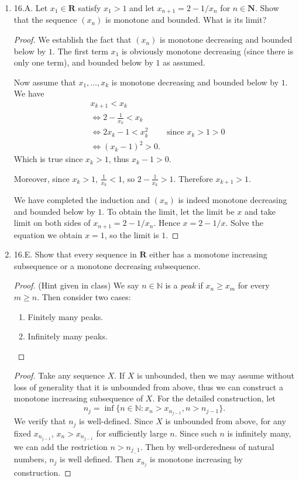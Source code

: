 
\begin{enumerate}
	\item 16.A. Let $x_1 \in \boldsymbol{R}$ satisfy $x_1>1$ and let $x_{n+1}=2-1 / x_n$ for $n \in \boldsymbol{N}$. Show that the sequence $\left(x_n\right)$ is monotone and bounded. What is its limit?
\begin{proof}
	We establish the fact that $(x_n)$ is monotone decreasing and bounded below by $1$. The first term $x_1$ is obviously monotone decreasing (since there is only one term), and bounded below by $1$ as assumed.

	Now assume that $x_1, \ldots, x_k$ is monotone decreasing and bounded below by $1$. We have
	\begin{align*}
		&x_{k+1}< x_k \\
		&\iff 2 - \frac{1}{x_k} < x_k \\
		&\iff 2 x_k - 1 < x_k ^2 &\text{since }x_k > 1 > 0 \\
		&\iff  (x_k - 1)^2 > 0
	.\end{align*}
	Which is true since $x_k > 1$, thus $x_k - 1>0$.

	Moreover, since $x_k > 1$, $\frac{1}{x_k}< 1$, so $2 - \frac{1}{x_k} > 1$. Therefore $x_{k+1} > 1$. 

	We have completed the induction and $(x_n)$ is indeed monotone decreasing and bounded below by $1$. To obtain the limit, let the limit be $x$ and take limit on both sides of $x_{n+1}=2-1 / x_n$. Hence $x = 2 - 1 /x$. Solve the equation we obtain $x = 1$, so the limit is $1$.
\end{proof}

	\item 16.E. Show that every sequence in $\boldsymbol{R}$ either has a monotone increasing subsequence or a monotone decreasing subsequence.
\begin{proof}
	(Hint given in class)
	We say $n \in \mathbb{N}$ is a \textit{peak} if $x_n \ge x_m$ for every $m \ge n$.
	Then consider two cases:
	\begin{enumerate}
		\item Finitely many peaks.
		\item Infinitely many peaks.
	\end{enumerate}
\end{proof}
\begin{proof}
	Take any sequence $X$. If $X$ is unbounded, then we may assume without loss of generality that it is unbounded from above, thus we can construct a monotone increasing subsequence of $X$. For the detailed construction, let
	\[
		n_j = \operatorname{inf} 
		\{n \in \mathbb{N}: x_{n}>x_{n_{j-1}}, n > n_{j-1}\} 
	.\] 
	We verify that $n_j$ is well-defined. Since $X$ is unbounded from above, for any fixed $x_{n_{j-1}}$, $x_n > x_{n_{j-1}}$ for sufficiently large $n$. Since such $n$ is infinitely many, we can add the restriction $n > n_{j_-1}$. Then by well-orderedness of natural numbers, $n_j$ is well defined.
	Then $x_{n_j}$ is monotone increasing by construction.


\end{proof}
\end{enumerate}
